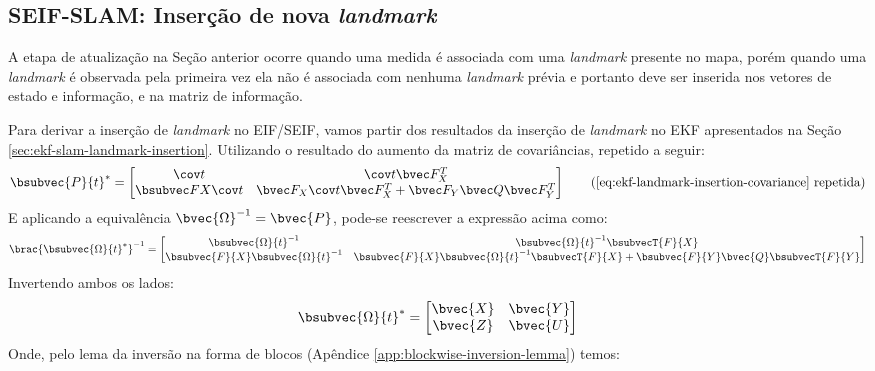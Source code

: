 \subsection{SEIF-SLAM: Inserção de nova \textit{landmark}}
A etapa de atualização na Seção anterior ocorre quando uma medida é 
associada com uma \textit{landmark} presente no mapa, porém quando 
uma \textit{landmark} é observada pela primeira vez ela não é 
associada com nenhuma \textit{landmark} prévia e portanto deve ser 
inserida nos vetores de estado e informação, e na matriz de informação. 

Para derivar a inserção de \textit{landmark} no EIF/SEIF, vamos partir 
dos resultados da inserção de \textit{landmark} no EKF apresentados na 
Seção \ref{sec:ekf-slam-landmark-insertion}. Utilizando o resultado do 
aumento da matriz de covariâncias, repetido a seguir:
\begingroup
\renewcommand{\arraystretch}{1.5}
\begin{equation*}
  \bsubvec{P}{t}^* = \eqCovarianceAugmented \tag{\ref{eq:ekf-landmark-insertion-covariance} repetida}
\end{equation*}
\endgroup
E aplicando a equivalência $\bvec{\Omega}^{-1} = \bvec{P}$, pode-se reescrever a expressão acima como:
\newcommand{\eqOmegaInv}{\bsubvec{\Omega}{t}^{-1}}
\begingroup
\renewcommand{\arraystretch}{1.5}
\begin{equation}
  \brac{\bsubvec{\Omega}{t}^*}^{-1} = \begin{bmatrix}
    \eqOmegaInv & \eqOmegaInv \bsubvecT{F}{X} \\
    \bsubvec{F}{X} \eqOmegaInv & \bsubvec{F}{X}\eqOmegaInv\bsubvecT{F}{X} + \bsubvec{F}{Y} \bvec{Q} \bsubvecT{F}{Y}
  \end{bmatrix}
\end{equation}
Invertendo ambos os lados:
\begin{equation*}
  \bsubvec{\Omega}{t}^* = \begin{bmatrix}
    \bvec{X} & \bvec{Y} \\
    \bvec{Z} & \bvec{U}
  \end{bmatrix}
\end{equation*}
\endgroup
Onde, pelo lema da inversão na forma de blocos (Apêndice \ref{app:blockwise-inversion-lemma}) temos:
\newcommand{\eqU}{\brac{\bsubvecT{F}{Y}}^{-1} \bvec{Q}^{-1} \bsubvec{F}{Y}^{-1}}
\addtolength{\jot}{1.4pt}
\begingroup
